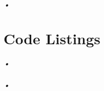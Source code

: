 \documentclass[a4paper, 12pt]{report}\dfrac{\right }{•}
\begin{document}
\paragraph{•}


\appendix
\chapter{Code Listings}
\label{cha:app-code}

\paragraph{•}
\begin{minipage}{\linewidth}

\end{minipage}

\paragraph{•}
\begin{minipage}{\linewidth}

\end{minipage}

{}

\end{document}
